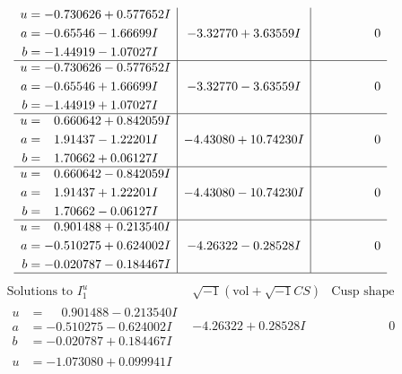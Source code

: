 \documentclass[1p]{elsarticle_modified}
\theoremstyle{definition}
\newcommand{\I}{\sqrt{-1}}
\begin{document}
$$\begin{array}{c|c|c}
\begin{aligned}
u &= -0.730626 + 0.577652 I \\
a &= -0.65546 - 1.66699 I \\
b &= -1.44919 - 1.07027 I\end{aligned}
 & -3.32770 + 3.63559 I & \phantom{-0.000000 } 0 \\ \hline\begin{aligned}
u &= -0.730626 - 0.577652 I \\
a &= -0.65546 + 1.66699 I \\
b &= -1.44919 + 1.07027 I\end{aligned}
 & -3.32770 - 3.63559 I & \phantom{-0.000000 } 0 \\ \hline\begin{aligned}
u &= \phantom{-}0.660642 + 0.842059 I \\
a &= \phantom{-}1.91437 - 1.22201 I \\
b &= \phantom{-}1.70662 + 0.06127 I\end{aligned}
 & -4.43080 + 10.74230 I & \phantom{-0.000000 } 0 \\ \hline\begin{aligned}
u &= \phantom{-}0.660642 - 0.842059 I \\
a &= \phantom{-}1.91437 + 1.22201 I \\
b &= \phantom{-}1.70662 - 0.06127 I\end{aligned}
 & -4.43080 - 10.74230 I & \phantom{-0.000000 } 0 \\ \hline\begin{aligned}
u &= \phantom{-}0.901488 + 0.213540 I \\
a &= -0.510275 + 0.624002 I \\
b &= -0.020787 - 0.184467 I\end{aligned}
 & -4.26322 - 0.28528 I & \phantom{-0.000000 } 0\\
 \hline 
 \end{array}$$\newpage$$\begin{array}{c|c|c}  
\text{Solutions to }I^u_{1}& \I (\text{vol} + \sqrt{-1}CS) & \text{Cusp shape}\\
 \hline 
\begin{aligned}
u &= \phantom{-}0.901488 - 0.213540 I \\
a &= -0.510275 - 0.624002 I \\
b &= -0.020787 + 0.184467 I\end{aligned}
 & -4.26322 + 0.28528 I & \phantom{-0.000000 } 0 \\ \hline\begin{aligned}
u &= -1.073080 + 0.099941 I \\

\end{aligned}
\end{array}$$
\end{document}
